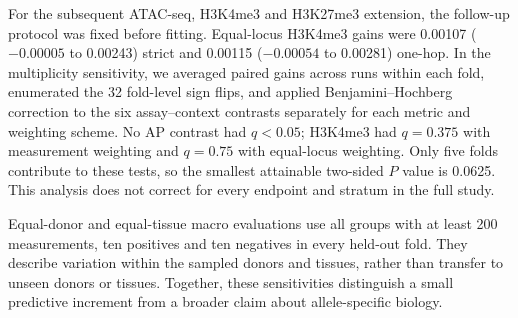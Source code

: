 \documentclass[11pt]{article}
\begin{document}
\begin{bibunit}[unsrtnat]
For the subsequent ATAC-seq, H3K4me3 and H3K27me3 extension, the follow-up protocol was fixed before fitting. Equal-locus H3K4me3 gains were 0.00107 ($-0.00005$ to 0.00243) strict and 0.00115 ($-0.00054$ to 0.00281) one-hop. In the multiplicity sensitivity, we averaged paired gains across runs within each fold, enumerated the 32 fold-level sign flips, and applied Benjamini--Hochberg correction to the six assay--context contrasts separately for each metric and weighting scheme. No AP contrast had $q<0.05$; H3K4me3 had $q=0.375$ with measurement weighting and $q=0.75$ with equal-locus weighting. Only five folds contribute to these tests, so the smallest attainable two-sided $P$ value is 0.0625. This analysis does not correct for every endpoint and stratum in the full study.

Equal-donor and equal-tissue macro evaluations use all groups with at least 200 measurements, ten positives and ten negatives in every held-out fold. They describe variation within the sampled donors and tissues, rather than transfer to unseen donors or tissues. Together, these sensitivities distinguish a small predictive increment from a broader claim about allele-specific biology.


\end{bibunit}
\end{document}
